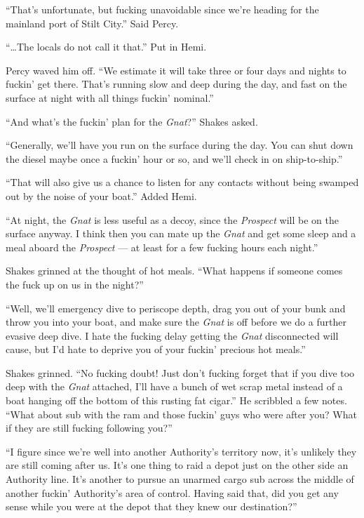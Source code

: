 \documentclass[
]{scrbook}
\begin{document}
``That's unfortunate, but fucking unavoidable since we're heading for
the mainland port of Stilt City.'' Said Percy.

``\ldots The locals do not call it that.'' Put in Hemi.

Percy waved him off. ``We estimate it will take three or four days and
nights to fuckin' get there. That's running slow and deep during the
day, and fast on the surface at night with all things fuckin' nominal.''

``And what's the fuckin' plan for the \emph{Gnat}?'' Shakes asked.

``Generally, we'll have you run on the surface during the day. You can
shut down the diesel maybe once a fuckin' hour or so, and we'll check in
on ship-to-ship.''

``That will also give us a chance to listen for any contacts without
being swamped out by the noise of your boat.'' Added Hemi.

``At night, the \emph{Gnat} is less useful as a decoy, since the
\emph{Prospect} will be on the surface anyway. I think then you can mate
up the \emph{Gnat} and get some sleep and a meal aboard the
\emph{Prospect} --- at least for a few fucking hours each night.''

Shakes grinned at the thought of hot meals. ``What happens if someone
comes the fuck up on us in the night?''

``Well, we'll emergency dive to periscope depth, drag you out of your
bunk and throw you into your boat, and make sure the \emph{Gnat} is off
before we do a further evasive deep dive. I hate the fucking delay
getting the \emph{Gnat} disconnected will cause, but I'd hate to deprive
you of your fuckin' precious hot meals.''

Shakes grinned. ``No fucking doubt! Just don't fucking forget that if
you dive too deep with the \emph{Gnat} attached, I'll have a bunch of
wet scrap metal instead of a boat hanging off the bottom of this rusting
fat cigar.'' He scribbled a few notes. ``What about sub with the ram and
those fuckin' guys who were after you? What if they are still fucking
following you?''

``I figure since we're well into another Authority's territory now, it's
unlikely they are still coming after us. It's one thing to raid a depot
just on the other side an Authority line. It's another to pursue an
unarmed cargo sub across the middle of another fuckin' Authority's area
of control. Having said that, did you get any sense while you were at
the depot that they knew our destination?''
\end{document}

